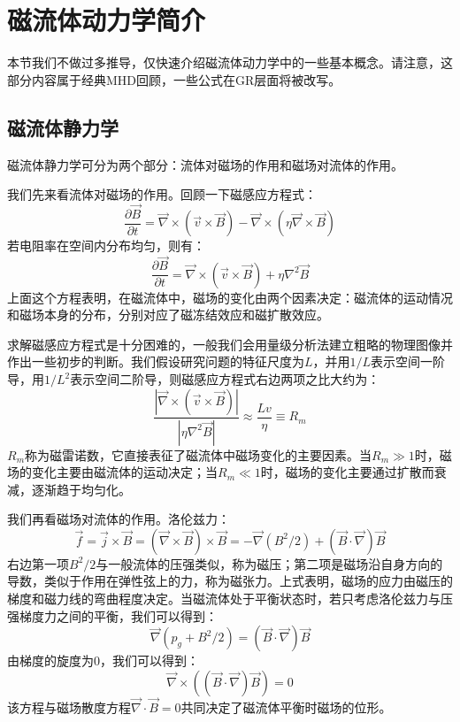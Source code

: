 \documentclass[lang=cn,color=blue,cm,11pt,scheme=chinese,bibend=bibtex,sorting=nty]{elegantbook}
\begin{document}
	\section{磁流体动力学简介}
	
	本节我们不做过多推导，仅快速介绍磁流体动力学中的一些基本概念。请注意，这部分内容属于经典MHD回顾，一些公式在GR层面将被改写。
	
	\subsection{磁流体静力学}
	
	磁流体静力学可分为两个部分：流体对磁场的作用和磁场对流体的作用。
	
	我们先来看流体对磁场的作用。回顾一下磁感应方程式：
	\begin{equation}
		\frac{\partial \vec{B}}{\partial t} = \vec{\nabla} \times (\vec{v} \times \vec{B}) - \vec{\nabla} \times (\eta \vec{\nabla} \times \vec{B})
	\end{equation}
	若电阻率在空间内分布均匀，则有：
	\begin{equation}
		\frac{\partial \vec{B}}{\partial t} = \vec{\nabla} \times (\vec{v} \times \vec{B}) + \eta \nabla^2 \vec{B}
	\end{equation}
	上面这个方程表明，在磁流体中，磁场的变化由两个因素决定：磁流体的运动情况和磁场本身的分布，分别对应了磁冻结效应和磁扩散效应。
	
	求解磁感应方程式是十分困难的，一般我们会用量级分析法建立粗略的物理图像并作出一些初步的判断。我们假设研究问题的特征尺度为$L$，并用$1/L$表示空间一阶导，用$1/L^2$表示空间二阶导，则磁感应方程式右边两项之比大约为：
	\begin{equation}
		\frac{| \vec{\nabla} \times (\vec{v} \times \vec{B}) |}{| \eta \nabla^2 \vec{B} |} \approx \frac{L v}{\eta} \equiv R_m
	\end{equation}
	$R_m$称为磁雷诺数，它直接表征了磁流体中磁场变化的主要因素。当$R_m \gg 1$时，磁场的变化主要由磁流体的运动决定；当$R_m \ll 1$时，磁场的变化主要通过扩散而衰减，逐渐趋于均匀化。
	
	我们再看磁场对流体的作用。洛伦兹力：
	\begin{equation}
		\vec{f} = \vec{j} \times \vec{B} = (\vec{\nabla} \times \vec{B}) \times \vec{B} = - \vec{\nabla} (B^2 / 2) + (\vec{B} \cdot \vec{\nabla}) \vec{B}
	\end{equation}
	右边第一项$B^2/2$与一般流体的压强类似，称为磁压；第二项是磁场沿自身方向的导数，类似于作用在弹性弦上的力，称为磁张力。上式表明，磁场的应力由磁压的梯度和磁力线的弯曲程度决定。当磁流体处于平衡状态时，若只考虑洛伦兹力与压强梯度力之间的平衡，我们可以得到：
	\begin{equation}
		\vec{\nabla} (p_g + B^2 / 2) = (\vec{B} \cdot \vec{\nabla}) \vec{B}
	\end{equation}
	由梯度的旋度为0，我们可以得到：
	\begin{equation}
		\vec{\nabla} \times ((\vec{B} \cdot \vec{\nabla}) \vec{B}) = 0
	\end{equation}
	该方程与磁场散度方程$\vec{\nabla} \cdot \vec{B} = 0$共同决定了磁流体平衡时磁场的位形。
	
\end{document}
